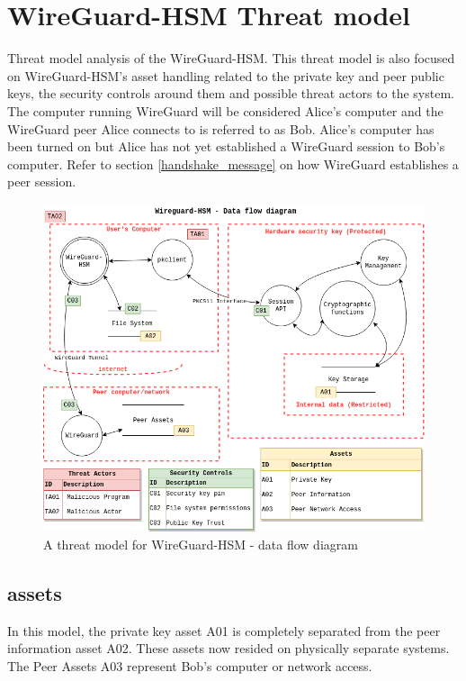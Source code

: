 \documentclass [11pt, proquest] {uwthesis}[2020/02/24]
\begin{document}
\section{WireGuard-HSM Threat model}
\label{wg-hsm-analysis}
Threat model analysis of the WireGuard-HSM. This threat model is also focused on WireGuard-HSM's asset handling related to the private key and peer public keys, the security controls around them and possible threat actors to the system. The computer running WireGuard will be considered Alice's computer and the WireGuard peer Alice connects to is referred to as Bob. Alice's computer has been turned on but Alice has not yet established a WireGuard session to Bob's computer. Refer to section \ref{handshake_message} on how WireGuard establishes a peer session. 

\begin{figure}[ht]
\includegraphics[width=14cm]{paper/images/WGHSM__NoPin_DFD.drawio}
\caption{A threat model for WireGuard-HSM - data flow diagram}
\label{fig:wg_hsm_dfd}
\end{figure}

\subsection{assets}
In this model, the private key asset A01 is completely separated from the peer information asset A02. These assets now resided on physically separate systems. The Peer Assets A03 represent Bob's computer or network access.
\end{document}
